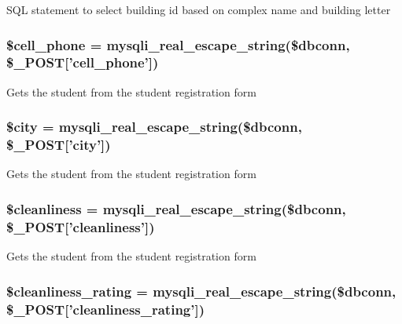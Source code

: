 \-S\-Q\-L statement to select building id based on complex name and building letter \hypertarget{admin__view_2validate_2studentVal_8php_a04f4e771f2239bf8a55f2ee7580a9609}{
\subsubsection[{\$cell\-\_\-phone}]{\setlength{\rightskip}{0pt plus 5cm}\$cell\-\_\-phone = mysqli\-\_\-real\-\_\-escape\-\_\-string(\$dbconn, \$\-\_\-\-P\-O\-S\-T\mbox{[}'cell\-\_\-phone'\mbox{]})}}\label{admin__view_2validate_2studentVal_8php_a04f4e771f2239bf8a55f2ee7580a9609}
\-Gets the student from the student registration form \hypertarget{admin__view_2validate_2studentVal_8php_a5b9ddd3e3a69d8901270064346bdef49}{
\subsubsection[{\$city}]{\setlength{\rightskip}{0pt plus 5cm}\$city = mysqli\-\_\-real\-\_\-escape\-\_\-string(\$dbconn, \$\-\_\-\-P\-O\-S\-T\mbox{[}'city'\mbox{]})}}\label{admin__view_2validate_2studentVal_8php_a5b9ddd3e3a69d8901270064346bdef49}
\-Gets the student from the student registration form \hypertarget{admin__view_2validate_2studentVal_8php_a7a259082f57125b6bd143f3387a5f655}{
\subsubsection[{\$cleanliness}]{\setlength{\rightskip}{0pt plus 5cm}\$cleanliness = mysqli\-\_\-real\-\_\-escape\-\_\-string(\$dbconn, \$\-\_\-\-P\-O\-S\-T\mbox{[}'cleanliness'\mbox{]})}}\label{admin__view_2validate_2studentVal_8php_a7a259082f57125b6bd143f3387a5f655}
\-Gets the student from the student registration form \hypertarget{admin__view_2validate_2studentVal_8php_aa181e44821f174a8b2551d5c30c03c1d}{
\subsubsection[{\$cleanliness\-\_\-rating}]{\setlength{\rightskip}{0pt plus 5cm}\$cleanliness\-\_\-rating = mysqli\-\_\-real\-\_\-escape\-\_\-string(\$dbconn, \$\-\_\-\-P\-O\-S\-T\mbox{[}'cleanliness\-\_\-rating'\mbox{]})}}\label{admin__view_2validate_2studentVal_8php_aa181e44821f174a8b2551d5c30c03c1d}
